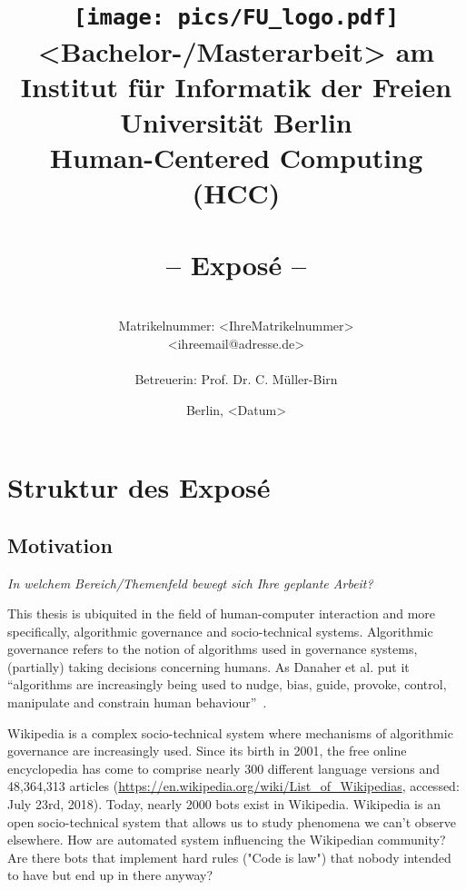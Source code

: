 \documentclass[pdftex,a4paper,11pt]{scrartcl}
\title{\texttt{[image: pics/FU\_logo.pdf]}\\
{\small <Bachelor-/Masterarbeit> am Institut für Informatik der Freien Universität Berlin}\\
{\small Human-Centered Computing (HCC)}\\
[6ex]
{\LARGE<Titel der Arbeit>}\\
{\normalsize-- Exposé --}}
\author{
{\emph{\normalsize<Ihr Vor- und Nachname>}}\\
{\normalsize Matrikelnummer: <IhreMatrikelnummer>}\\
{\normalsize <ihreemail@adresse.de>}\\\\
{\normalsize Betreuerin: Prof. Dr. C. Müller-Birn}
}
\date{\normalsize Berlin, <Datum>}
\newcommand{\blankpage}{
\newpage
\thispagestyle{empty}
\mbox{}
\newpage
}
\begin{document}
\maketitle

\thispagestyle{empty}  %

\blankpage

\setcounter{page}{1} %

\section{Struktur des Exposé}
\begin{comment}
Im Folgenden habe ich Ihnen eine generelle Struktur für ein Exposé vorgegeben. Jeder Abschnitt wird mit Fragen eingeleitet, welchen den Inhalt des Abschnitts abdecken. Ich gebe Ihnen, wenn erforderlich, noch einige Erläuterungen. Bitte beachten Sie, dass das Layout dieser Vorlage doppelseitig angelegt ist und daher auch der Ausdruck doppelseitig erfolgen sollte. Zur Erinnerung: ein Exposé umfasst ungefähr sechs bis zehn Seiten abhängig vom Thema. Der Inhalt des Exposé bildet dann das Grundgerüst für die schriftliche Ausarbeitung Ihrer Masterarbeit. Erst nach Abnahme des Exposé sollten Sie Ihre Masterarbeit anmelden.
\end{comment}

\subsection{Motivation}
\noindent \emph{In welchem Bereich/Themenfeld bewegt sich Ihre geplante Arbeit? }

This thesis is ubiquited in the field of human-computer interaction and more
specifically, algorithmic governance and socio-technical systems.
Algorithmic governance refers to the notion of algorithms used in governance systems, (partially) taking decisions concerning humans.
As Danaher et al. put it ``algorithms are increasingly being used to nudge, bias, guide, provoke, control, manipulate and constrain human behaviour''~\cite{DanaherEtAl2017}.

Wikipedia is a complex socio-technical system where mechanisms of algorithmic governance are increasingly used.
Since its birth in 2001, the free online encyclopedia has come to comprise nearly 300 different language versions and 48,364,313 articles (\url{https://en.wikipedia.org/wiki/List_of_Wikipedias}, accessed: July 23rd, 2018).
Today, nearly 2000 bots exist in Wikipedia.
Wikipedia is an open socio-technical system that allows us to study phenomena we can't observe
elsewhere.
How are automated system influencing the Wikipedian community?
Are there bots that implement hard rules ("Code is law") that nobody intended
to have but end up in there anyway?
\end{document}
